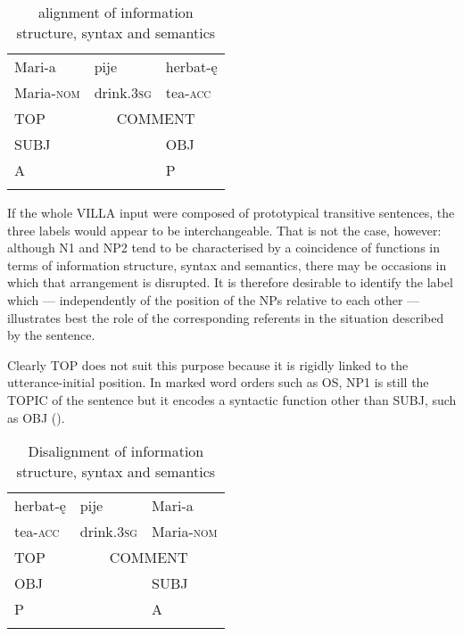 \begin{table}
    \begin{tabular}{lll}
    \lsptoprule
        Mari-a & pije & herbat-ę\\
        Maria-\textsc{nom} & drink.\textsc{3sg} & tea-\textsc{acc}\\
        \cmidrule(lr){1-1}\cmidrule(lr){2-3}
        TOP & \multicolumn{2}{c}{ COMMENT}\\
        \cmidrule(lr){1-1}\cmidrule(lr){3-3}
        SUBJ &  &  OBJ\\
        \cmidrule(lr){1-1}\cmidrule(lr){3-3}
        A &  &  P\\
    \lspbottomrule
    \end{tabular}
    \caption{alignment of information structure, syntax and semantics}
    \label{tab:01:1}
\end{table}

\newpage
If the whole VILLA input were composed of prototypical transitive sentences, the three labels would appear to be interchangeable. That is not the case, however: although N1 and NP2 tend to be characterised by a coincidence of functions in terms of information structure, syntax and semantics, there may be occasions in which that arrangement is disrupted. It is therefore desirable to identify the label which — independently of the position of the NPs relative to each other — illustrates best the role of the corresponding referents in the situation described by the sentence.

Clearly TOP does not suit this purpose because it is rigidly linked to the ut\-ter\-ance-initial position. In marked word orders such as OS, NP1 is still the TOPIC of the sentence but it encodes a syntactic function other than SUBJ, such as OBJ ().

\begin{table}
    \begin{tabular}{lll}
    \lsptoprule
        herbat-ę & pije & Mari-a \\
        tea-\textsc{acc} & drink.\textsc{3sg} & Maria-\textsc{nom}\\
        \cmidrule(lr){1-1}\cmidrule(lr){2-3}
        TOP & \multicolumn{2}{c}{COMMENT}\\
        \cmidrule(lr){1-1}\cmidrule(lr){3-3}
        OBJ &  & SUBJ\\
        \cmidrule(lr){1-1}\cmidrule(lr){3-3}
        P &  & A\\
    \lspbottomrule
    \end{tabular}
    \caption{Disalignment of information structure, syntax and semantics}
    \label{tab:01:2}
\end{table}

